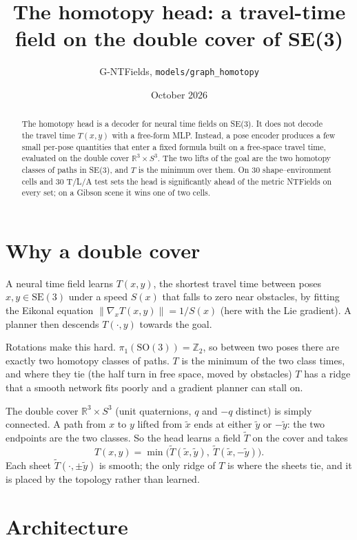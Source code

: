 \documentclass[10pt]{article}
\title{The homotopy head: a travel-time field on the double cover of SE(3)}
\author{G-NTFields, \texttt{models/graph\_homotopy}}
\date{October 2026}
\newcommand{\T}{\tilde T}
\newcommand{\xt}{\tilde x}
\newcommand{\yt}{\tilde y}
\begin{document}
\maketitle

\begin{abstract}
The homotopy head is a decoder for neural time fields on SE(3). It does not decode the travel time $T(x,y)$ with a
free-form MLP. Instead, a pose encoder produces a few small per-pose quantities that enter a fixed formula built on a
free-space travel time, evaluated on the double cover $\mathbb{R}^3\times S^3$. The two lifts of the goal are the two
homotopy classes of paths in SE(3), and $T$ is the minimum over them. On 30 shape--environment cells and 30 T/L/A test
sets the head is significantly ahead of the metric NTFields on every set; on a Gibson scene it wins one of two cells.
\end{abstract}

\section{Why a double cover}
A neural time field learns $T(x,y)$, the shortest travel time between poses $x,y\in\mathrm{SE}(3)$ under a speed
$S(x)$ that falls to zero near obstacles, by fitting the Eikonal equation $\|\nabla_x T(x,y)\| = 1/S(x)$ (here with the
Lie gradient). A planner then descends $T(\cdot, y)$ towards the goal.

Rotations make this hard. $\pi_1(\mathrm{SO}(3)) = \mathbb{Z}_2$, so between two poses there are exactly two homotopy
classes of paths. $T$ is the minimum of the two class times, and where they tie (the half turn in free space, moved by
obstacles) $T$ has a ridge that a smooth network fits poorly and a gradient planner can stall on.

The double cover $\mathbb{R}^3\times S^3$ (unit quaternions, $q$ and $-q$ distinct) is simply connected. A path from $x$
to $y$ lifted from $\xt$ ends at either $\yt$ or $-\yt$: the two endpoints are the two classes. So the head learns a
field $\T$ on the cover and takes
\begin{equation}
  T(x,y) = \min\bigl(\T(\xt,\yt),\ \T(\xt,-\yt)\bigr).
\end{equation}
Each sheet $\T(\cdot,\pm\yt)$ is smooth; the only ridge of $T$ is where the sheets tie, and it is placed by the
topology rather than learned.

\section{Architecture}
\end{document}
